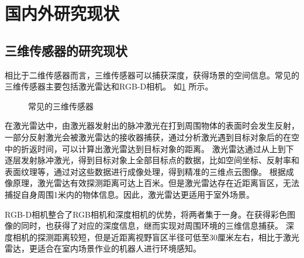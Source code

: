 \section{国内外研究现状}

\subsection{三维传感器的研究现状}
相比于二维传感器而言，三维传感器可以捕获深度，获得场景的空间信息。常见的三维传感器主要包括激光雷达和RGB-D相机。
如\ref{图：常见的三维传感器} 所示。
\begin{figure}[h]
	\centering%
	\vspace{-1em}
	\caption{常见的三维传感器}
	\label{图：常见的三维传感器}
\end{figure}

在激光雷达中，由激光器发射出的脉冲激光在打到周围物体的表面时会发生反射，一部分反射激光会被激光雷达的接收器捕获，通过分析激光遇到目标对象后的在空中的折返时间，可以计算出激光雷达到目标对象的距离。
激光雷达通过从上到下逐层发射脉冲激光，得到目标对象上全部目标点的数据，比如空间坐标、反射率和表面纹理等，通过对这些数据进行成像处理，得到精准的三维点云图像。
根据成像原理，激光雷达有效探测距离可达上百米。但是激光雷达存在近距离盲区，无法捕捉自身周围1米内的物体信息。因此，激光雷达更适用于室外场景。


RGB-D相机整合了RGB相机和深度相机的优势，将两者集于一身。在获得彩色图像的同时，也获得了对应的深度信息，继而实现对周围环境的三维信息捕获。
深度相机的探测距离较短，但是近距离视野盲区半径可低至30厘米左右，相比于激光雷达，更适合在室内场景作业的机器人进行环境感知。


